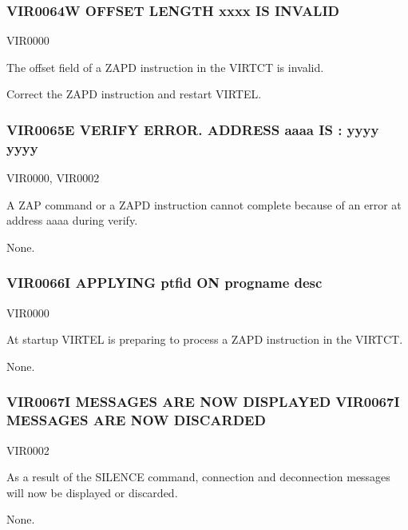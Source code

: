 \documentclass[letterpaper,10pt,english]{sphinxmanual}
\begin{document}
\subsubsection{VIR0064W OFFSET LENGTH xxxx IS INVALID}
\label{\detokenize{messages:vir0064w-offset-length-xxxx-is-invalid}}\begin{description}
\sphinxAtStartPar
VIR0000

\sphinxAtStartPar
The offset field of a ZAPD instruction in the VIRTCT is invalid.

\sphinxAtStartPar
Correct the ZAPD instruction and restart VIRTEL.

\end{description}


\subsubsection{VIR0065E VERIFY ERROR. ADDRESS aaaa IS : yyyy yyyy}
\label{\detokenize{messages:vir0065e-verify-error-address-aaaa-is-yyyy-yyyy}}\begin{description}
\sphinxAtStartPar
VIR0000, VIR0002

\sphinxAtStartPar
A ZAP command or a ZAPD instruction cannot complete because of an error at address aaaa during verify.

\sphinxAtStartPar
None.

\end{description}


\subsubsection{VIR0066I APPLYING ptfid ON progname desc}
\label{\detokenize{messages:vir0066i-applying-ptfid-on-progname-desc}}\begin{description}
\sphinxAtStartPar
VIR0000

\sphinxAtStartPar
At startup VIRTEL is preparing to process a ZAPD instruction in the VIRTCT.

\sphinxAtStartPar
None.

\end{description}


\subsubsection{VIR0067I MESSAGES ARE NOW DISPLAYED VIR0067I MESSAGES ARE NOW DISCARDED}
\label{\detokenize{messages:vir0067i-messages-are-now-displayed-vir0067i-messages-are-now-discarded}}\begin{description}
\sphinxAtStartPar
VIR0002

\sphinxAtStartPar
As a result of the SILENCE command, connection and deconnection messages will now be displayed or discarded.

\sphinxAtStartPar
None.

\end{description}
\end{document}
